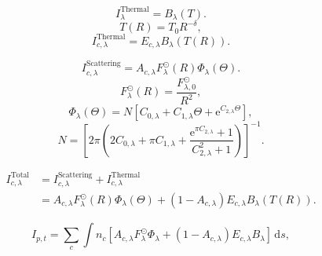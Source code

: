 \documentclass{aa}
\begin{document}
\begin{equation}
    I^\mathrm{Thermal}_{\lambda} = B_\lambda(T).
\end{equation}
\begin{equation}
    T(R) = T_0 R^{-\delta},
\end{equation}
\begin{equation}
    I^\mathrm{Thermal}_{c,\lambda} = E_{c,\lambda} B_\lambda(T(R)).
\end{equation}

\begin{equation}\label{eq: scat_term}
    I^\mathrm{Scattering}_{c, \lambda} = A_{c, \lambda} F_\lambda^\odot(R) \Phi_\lambda(\Theta).
\end{equation}
\begin{equation}
    F_\lambda^\odot(R) = \frac{F_{\lambda,0}^\odot}{R^2},
\end{equation}
\begin{equation}
    \Phi_{\lambda}(\Theta)=N\left[C_{0, \lambda}+C_
    {1, \lambda} \Theta+\mathrm{e}^{C_{2, \lambda} \Theta}\right],
\end{equation}
\begin{equation}
    N = \left[ 2\pi \left( 2 C_{0, \lambda} + \pi C_{1, \lambda} + \frac{\mathrm{e}^{\pi C_{2, \lambda}} + 1}{{C^2_{2, \lambda}} + 1} \right)\right]^{-1}.
\end{equation}

\begin{align}
    I^\mathrm{Total}_{c, \lambda} &= I^\mathrm{Scattering}_{c,\lambda} + I^\mathrm{Thermal}_{c,\lambda}\\
    &= A_{c, \lambda} F_\lambda^\odot(R) \Phi_\lambda(\Theta) + \left( 1 - A_{c, \lambda} \right) E_{c,\lambda} B_\lambda(T(R)).
\end{align}

\begin{equation}\label{eq: intensity}
    I_{p,t} = \sum_c \int n_c \left[  A_{c, \lambda} F_\lambda^\odot \Phi_\lambda + \left( 1 - A_{c, \lambda} \right) E_{c,\lambda} B_\lambda \right]\,\mathrm ds,
\end{equation}
\end{document}
